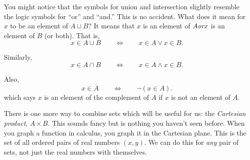 \documentclass[10pt,]{book}
\theoremstyle{plain}
\theoremstyle{definition}
\theoremstyle{definition}
\theoremstyle{definition}
\numberwithin{equation}{section}
\def\Iff{\Leftrightarrow}
\def\bar{\overline}
\begin{document}
      You might notice that the symbols for union and intersection slightly resemble the logic symbols for ``or'' and ``and.'' This is no accident. What does it mean for \(x\) to be an element of \(A\cup B\)? It means that \(x\) is an element of \(A\emph{or}x\) is an element of \(B\) (or both). That is,
      \begin{equation*}
        x \in A \cup B \qquad \Iff \qquad x \in A \vee x \in B.
      \end{equation*}
\par

      Similarly,
      \begin{equation*}
        x \in A \cap B \qquad \Iff \qquad x \in A \wedge x \in B.
      \end{equation*}
\par

      Also,
      \begin{equation*}
        x \in \bar A \qquad \Iff \qquad \neg (x \in A).
      \end{equation*}
      which says \(x\) is an element of the complement of \(A\) if \(x\) is not an element of \(A\).
\par

      There is one more way to combine sets which will be useful for us: the \emph{Cartesian product}, \(A \times B\). This sounds fancy but is nothing you haven't seen before. When you graph a function in calculus, you graph it in the Cartesian plane. This is the set of all ordered pairs of real numbers \((x,y)\). We can do this for \emph{any} pair of sets, not just the real numbers with themselves.
\par
\end{document}

